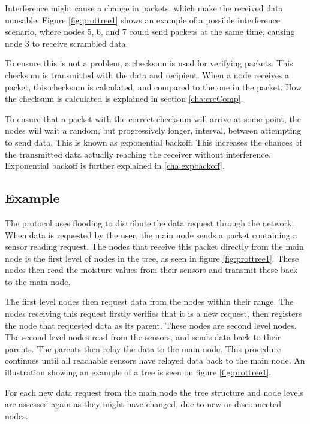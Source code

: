 Interference might cause a change in packets, which make the received data unusable. Figure \ref{fig:prottree1} shows an example of a possible interference scenario, where nodes 5, 6, and 7 could send packets at the same time, causing node 3 to receive scrambled data.

To ensure this is not a problem, a checksum is used for verifying packets. This checksum is transmitted with the data and recipient. When a node receives a packet, this checksum is calculated, and compared to the one in the packet. How the checksum is calculated is explained in section \ref{cha:crcComp}.

To ensure that a packet with the correct checksum will arrive at some point, the nodes will wait a random, but progressively longer, interval, between attempting to send data. This is known as exponential backoff. This increases the chances of the transmitted data actually reaching the receiver without interference. Exponential backoff is further explained in \ref{cha:expbackoff}.


\subsection*{Example}
The protocol uses flooding to distribute the data request through the network. 
When data is requested by the user, the main node sends a packet containing a sensor reading request. 
The nodes that receive this packet directly from the main node is the first level of nodes in the tree, as seen in figure \ref{fig:prottree1}. 
These nodes then read the moisture values from their sensors and transmit these back to the main node. 

The first level nodes then request data from the nodes within their range. 
The nodes receiving this request firstly verifies that it is a new request, then registers the node that requested data as its parent. 
These nodes are second level nodes. The second level nodes read from the sensors, and sends data back to their parents. The parents then relay the data to the main node. 
This procedure continues until all reachable sensors have relayed data back to the main node.
An illustration showing an example of a tree is seen on figure \ref{fig:prottree1}.

For each new data request from the main node the tree structure and node levels are assessed again as they might have changed, due to new or disconnected nodes.

